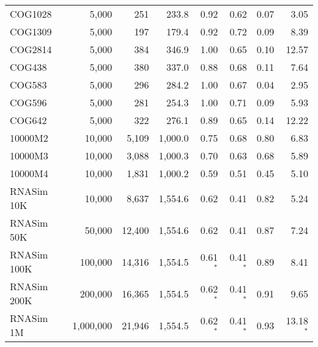 \begin{table}
{\begin{tabular}{lrrrrrrr}
\hline
 COG1028          & 5,000       & 251  &233.8                        & 0.92            & 0.62           & 0.07           & 3.05           \\
 COG1309          & 5,000       & 197   &179.4                       & 0.92            & 0.72           & 0.09           & 8.39           \\
 COG2814          & 5,000       & 384         &346.9                 & 1.00            & 0.65           & 0.10           & 12.57          \\
 COG438           & 5,000       & 380      &337.0                    & 0.88            & 0.68           & 0.11           & 7.64           \\
 COG583           & 5,000       & 296   &284.2                       & 1.00            & 0.67           & 0.04           & 2.95           \\
 COG596           & 5,000       & 281   &254.3                       & 1.00            & 0.71           & 0.09           & 5.93           \\
 COG642           & 5,000       & 322   &276.1                       & 0.89            & 0.65           & 0.14           & 12.22          \\
\hline
 10000M2          & 10,000      & 5,109&1,000.0                         & 0.75            & 0.68           & 0.80           & 6.83           \\
 10000M3          & 10,000      & 3,088 &1,000.3                        & 0.70            & 0.63           & 0.68           & 5.89           \\
 10000M4          & 10,000      & 1,831   &1,000.2                      & 0.59            & 0.51           & 0.45           & 5.10           \\
\hline
RNASim        10K            & 10,000      & 8,637  &1,554.6                       & 0.62            & 0.41           & 0.82           & 5.24\\
RNASim        50K            & 50,000      & 12,400        &1,554.6                 & 0.62            & 0.41           & 0.87           & 7.24\\    
RNASim        100K            & 100,000      & 14,316      &1,554.5                   & 0.61$^*$            & 0.41$^*$           & 0.89           & 8.41\\    
RNASim        200K            & 200,000      & 16,365      &1,554.5                   & 0.62$^*$            & 0.41$^*$           & 0.91           & 9.65\\
RNASim        1M            & 1,000,000      & 21,946    &1,554.5                     & 0.62$^*$            & 0.41$^*$           & 0.93           & 13.18$^*$\\    
    \hline
    \end{tabular}}
\end{table}

